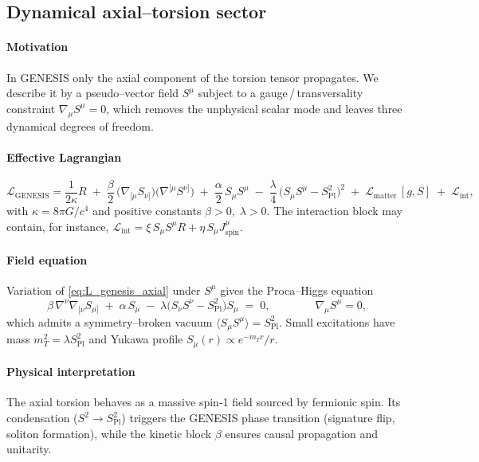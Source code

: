 \documentclass{article}
\newcommand{\Splanck}{S_{\mathrm{Pl}}}
\begin{document}
\subsection{Dynamical axial--torsion sector}
\label{sec:dynamic-lagrangian}

\paragraph{Motivation}
In GENESIS only the axial component of the torsion tensor propagates.  We describe it
by a pseudo--vector field \(S^\mu\) subject to a gauge\,/\,transversality constraint
\(\nabla_\mu S^\mu = 0\), which removes the unphysical scalar mode and leaves three
dynamical degrees of freedom.

\paragraph{Effective Lagrangian}
\begin{equation}
\label{eq:L_genesis_axial}
\mathcal{L}_{\text{GENESIS}} =
\frac{1}{2\kappa} R
\;+\;
\frac{\beta}{2}\,
\bigl(\nabla_{[\mu} S_{\nu]}\bigr)
\bigl(\nabla^{[\mu} S^{\nu]}\bigr)
\;+\;
\frac{\alpha}{2}\,S_\mu S^\mu
\;-\;
\frac{\lambda}{4}\,\bigl(S_\mu S^\mu - \Splanck^{2}\bigr)^{2}
\;+\;
\mathcal{L}_{\text{matter}}\,[g,S]
\;+\;
\mathcal{L}_{\text{int}},
\end{equation}
with
\(\kappa = 8\pi G/c^{4}\) and positive constants \(\beta>0,\;\lambda>0\).
The interaction block may contain, for instance,
\(\mathcal{L}_{\text{int}} = \xi\,S_\mu S^\mu R + \eta\,S_\mu J_{\text{spin}}^{\mu}\).

\paragraph{Field equation}
Variation of \eqref{eq:L_genesis_axial} under \(S^\mu\) gives the Proca--Higgs equation
\begin{equation}
\label{eq:EOM_axial}
\beta\,\nabla^{\nu}\nabla_{[\nu} S_{\mu]}
\;+\;
\alpha\,S_\mu
\;-\;
\lambda\bigl(S_\nu S^\nu - \Splanck^{2}\bigr) S_\mu
\;=\;0,
\qquad\qquad
\nabla_\mu S^\mu = 0,
\end{equation}
which admits a symmetry--broken vacuum
\(\langle S_\mu S^\mu\rangle = \Splanck^{2}\).
Small excitations have mass
\(m_{T}^{2} = \lambda \Splanck^{2}\)
and Yukawa profile
\(S_\mu(r)\propto e^{-m_T r}/r\).

\paragraph{Physical interpretation}
The axial torsion behaves as a massive spin‑1 field sourced by fermionic spin.
Its condensation (\(S^2\!\to\!\Splanck^{2}\)) triggers
the GENESIS phase transition (signature flip, soliton formation),
while the kinetic block \(\beta\) ensures causal propagation and unitarity.
\end{document}
